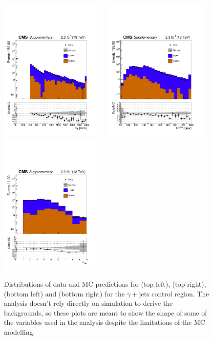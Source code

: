 \clearpage
\begin{figure}[tbhp]
    \caption{ 
    Distributions of data and MC predictions for \scalht (top left), \mht (top right), \nj (bottom left) and \nb (bottom right) 
    for the $\gamma+\mathrm{jets}$ control region. 
    The analysis doesn't rely directly on simulation to derive the backgrounds, 
    so these plots are meant to show the shape of some of the variables used in the analysis despite the limitations 
    of the MC modelling. 
    \label{fig:data-MC_plots_SinglePhoton} }
  \begin{center}
     \includegraphics[width=0.45\textwidth]{figures/SinglePhoton_ht40_all_all} ~~
     \includegraphics[width=0.45\textwidth]{figures/SinglePhoton_mht40_pt_all_all} \\
     \includegraphics[width=0.45\textwidth]{figures/SinglePhoton_nJet40_all_all} ~~

\end{center}
\end{figure}
